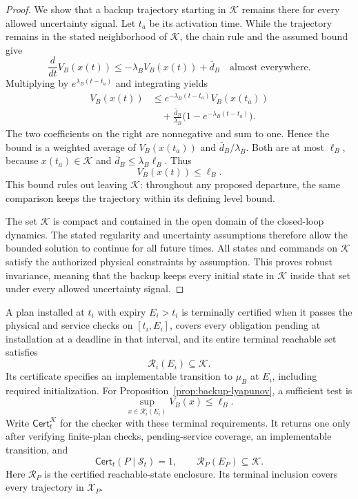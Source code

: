 \documentclass[preprint,12pt]{elsarticle}
\begin{document}
\begin{proof}
We show that a backup trajectory starting in $\mathcal K$ remains there
for every allowed uncertainty signal. Let $t_a$ be its activation time.
While the trajectory remains in the stated neighborhood of $\mathcal K$,
the chain rule and the assumed bound give
\[
 \frac{d}{dt}V_B(x(t))
 \le-\lambda_B V_B(x(t))+\bar d_B
 \quad\text{almost everywhere}.
\]
Multiplying by $e^{\lambda_B(t-t_a)}$ and integrating yields
\[
\begin{aligned}
 V_B(x(t))
 &\le e^{-\lambda_B(t-t_a)}V_B(x(t_a))\\
 &\quad+
 \frac{\bar d_B}{\lambda_B}
 \bigl(1-e^{-\lambda_B(t-t_a)}\bigr).
\end{aligned}
\]
The two coefficients on the right are nonnegative and sum to one.
Hence the bound is a weighted average of $V_B(x(t_a))$ and
$\bar d_B/\lambda_B$. Both are at most $\ell_B$, because
$x(t_a)\in\mathcal K$ and $\bar d_B\le\lambda_B\ell_B$. Thus
\[
 V_B(x(t))\le\ell_B.
\]
This bound rules out leaving $\mathcal K$: throughout any proposed
departure, the same comparison keeps the trajectory within its defining
level bound.

The set $\mathcal K$ is compact and contained in the open domain of the
closed-loop dynamics. The stated regularity and uncertainty assumptions
therefore allow the bounded solution to continue for all future times.
All states and commands on $\mathcal K$ satisfy the authorized physical
constraints by assumption. This proves robust invariance, meaning that
the backup keeps every initial state in $\mathcal K$ inside that set under
every allowed uncertainty signal.
\end{proof}

A plan installed at $t_i$ with expiry $E_i>t_i$ is terminally certified
when it passes the physical and service checks on $[t_i,E_i]$, covers
every obligation pending at installation at a deadline in that interval,
and its entire terminal reachable set satisfies
\begin{equation}
\mathcal R_i(E_i)\subseteq\mathcal K.
\label{eq:backup-terminal-landing}
\end{equation}
Its certificate specifies an implementable transition to $\mu_B$ at
$E_i$, including required initialization. For
Proposition~\ref{prop:backup-lyapunov}, a sufficient test is
\begin{equation}
\sup_{x\in\mathcal R_i(E_i)}V_B(x)\le\ell_B.
\label{eq:backup-computable-landing}
\end{equation}
Write $\mathsf{Cert}^{\mathcal K}_t$ for the checker with these
terminal requirements. It returns one only after verifying finite-plan
checks, pending-service coverage, an implementable transition, and
\begin{equation}
\mathsf{Cert}_t(P\mid\mathcal S_t)=1,\qquad
\mathcal R_P(E_P)\subseteq\mathcal K.
\label{eq:terminal-checker}
\end{equation}
Here $\mathcal R_P$ is the certified reachable-state enclosure. Its
terminal inclusion covers every trajectory in $\mathcal X_P$.
\end{document}
